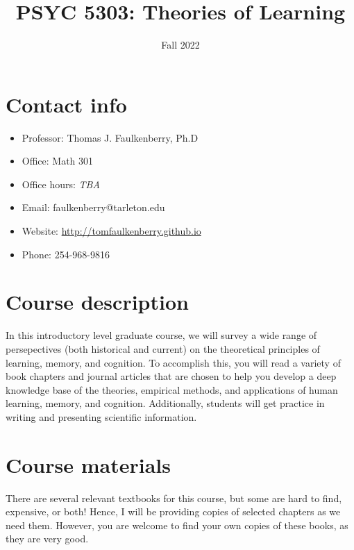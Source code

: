 \documentclass[10pt]{article}
\date{Fall 2022}
\title{PSYC 5303: Theories of Learning}
\begin{document}
\maketitle

\section*{Contact info}
\label{sec:orgb038789}
\begin{itemize}
\item Professor: Thomas J. Faulkenberry, Ph.D
\item Office: Math 301
\item Office hours: \emph{TBA}
\item Email: faulkenberry@tarleton.edu
\item Website: \url{http://tomfaulkenberry.github.io}
\item Phone: 254-968-9816
\end{itemize}

\section*{Course description}
\label{sec:org5b6fbc2}

In this introductory level graduate course, we will survey a wide range of persepectives (both historical and current) on the theoretical principles of learning, memory, and cognition.  To accomplish this, you will read a variety of book chapters and journal articles that are chosen to help you develop a deep knowledge base of the theories, empirical methods, and applications of human learning, memory, and cognition. Additionally, students will get practice in writing and presenting scientific information.

\section*{Course materials}
\label{sec:org9e41506}

There are several relevant textbooks for this course, but some are hard to find, expensive, or both!  Hence, I will be providing copies of selected chapters as we need them.  However, you are welcome to find your own copies of these books, as they are very good.
\end{document}

